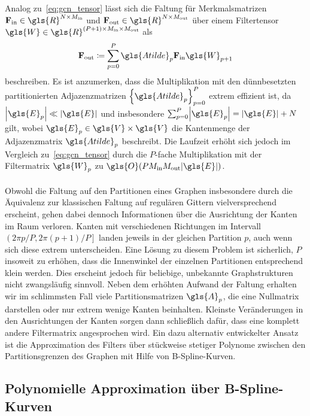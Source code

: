 Analog zu~\eqref{eq:gcn_tensor} lässt sich die Faltung für Merkmalsmatrizen $\ma{F}_{\mathrm{in}} \in \gls{R}^{N \times M_{\mathrm{in}}}$ und $\ma{F}_{\mathrm{out}} \in \gls{R}^{N \times M_{\mathrm{out}}}$ über einem Filtertensor $\gls{W} \in \gls{R}^{\left(P+1\right) \times M_{\mathrm{in}} \times M_{\mathrm{out}}}$ als
\begin{equation*}
  \ma{F}_{\mathrm{out}} \coloneqq \sum_{p=0}^P \gls{Atilde}_p\ma{F}_{\mathrm{in}}\gls{W}_{p+1}
\end{equation*}
beschreiben.
Es ist anzumerken, dass die Multiplikation mit den dünnbesetzten partitionierten Adjazenzmatrizen ${\left\{\gls{Atilde}_p\right\}}_{p=0}^P$ extrem effizient ist, da $\left|\gls{E}_p\right| \ll \left|\gls{E}\right|$ und insbesondere $\sum_{p=0}^P \left|\gls{E}_p\right| = \left|\gls{E}\right| + N$ gilt, wobei $\gls{E}_p \in \gls{V} \times \gls{V}$ die Kantenmenge der Adjazenzmatrix $\gls{Atilde}_p$ beschreibt.
Die Laufzeit erhöht sich jedoch im Vergleich zu~\eqref{eq:gcn_tensor} durch die $P$-fache Multiplikation mit der Filtermatrix $\gls{W}_p$ zu $\gls{O}\left(PM_{\mathrm{in}}M_{\mathrm{out}}\left|\gls{E}\right|\right)$.
\\\\
Obwohl die Faltung auf den Partitionen eines Graphen insbesondere durch die Äquivalenz zur klassischen Faltung auf regulären Gittern vielversprechend erscheint, gehen dabei dennoch Informationen über die Ausrichtung der Kanten im Raum verloren.
Kanten mit verschiedenen Richtungen im Intervall $\left(2\pi p/P, 2\pi \left(p+1\right)/P\right]$ landen jeweils in der gleichen Partition $p$, auch wenn sich diese \evtl{} extrem unterscheiden.
Eine Lösung zu diesem Problem ist sicherlich, $P$ insoweit zu erhöhen, dass die Innenwinkel der einzelnen Partitionen entsprechend klein werden.
Dies erscheint jedoch für beliebige, unbekannte Graphstrukturen nicht zwangsläufig sinnvoll.
Neben dem erhöhten Aufwand der Faltung erhalten wir im schlimmsten Fall viele Partitionsmatrizen $\gls{A}_p$, die eine Nullmatrix  darstellen oder nur extrem wenige Kanten beinhalten.
Kleinste Veränderungen in den Ausrichtungen der Kanten sorgen dann schließlich dafür, dass eine komplett andere Filtermatrix angesprochen wird.
Ein dazu alternativ entwickelter Ansatz ist die Approximation des Filters über stückweise stetiger Polynome zwischen den Partitionsgrenzen des Graphen mit Hilfe von B-Spline-Kurven.

\subsection{Polynomielle Approximation über B-Spline-Kurven}
\label{bspline}

